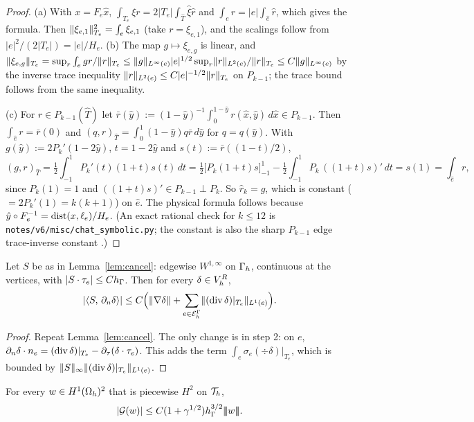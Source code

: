 \begin{proof}
(a) With $x=F_e\hat x$, $\int_{T_e}\xi r=2|T_e|\int_{\hat T}\hat\xi\hat r$ and $\int_er=|e|\int_{\hat e}\hat r$, which gives the formula. Then $\lVert \xi_{e,1}\rVert^2_{T_e}=\int_e\xi_{e,1}$ (take $r=\xi_{e,1}$), and the scalings follow from $|e|^2/(2|T_e|)=|e|/H_e$. (b) The map $g\mapsto\xi_{e,g}$ is linear, and $\lVert \xi_{e,g}\rVert_{T_e}=\sup_r\int_egr/\lVert r\rVert_{T_e}\le\lVert g\rVert_{L^\infty(e)}|e|^{1/2}\sup_r\lVert r\rVert_{L^2(e)}/\lVert r\rVert_{T_e}\le C\lVert g\rVert_{L^\infty(e)}$ by the inverse trace inequality $\lVert r\rVert_{L^2(e)}\le C|e|^{-1/2}\lVert r\rVert_{T_e}$ on $P_{k-1}$; the trace bound follows from the same inequality.

(c) For $r\in P_{k-1}(\hat T)$ let $\bar r(\hat y):=(1-\hat y)^{-1}\int_0^{1-\hat y}r(\hat x,\hat y)\,d\hat x\in P_{k-1}$. Then $\int_{\hat e}r=\bar r(0)$ and $(q,r)_{\hat T}=\int_0^1(1-\hat y)q\bar r\,d\hat y$ for $q=q(\hat y)$. With $g(\hat y):=2P_k'(1-2\hat y)$, $t=1-2\hat y$ and $s(t):=\bar r((1-t)/2)$,
\[
(g,r)_{\hat T}=\tfrac12\int_{-1}^1P_k'(t)(1+t)s(t)\,dt=\tfrac12\bigl[P_k(1+t)s\bigr]_{-1}^1-\tfrac12\int_{-1}^1P_k\,((1+t)s)'\,dt=s(1)=\int_{\hat e}r,
\]
since $P_k(1)=1$ and $((1+t)s)'\in P_{k-1}\perp P_k$. So $\hat r_k=g$, which is constant ($=2P_k'(1)=k(k+1)$) on $\hat e$. The physical formula follows because $\hat y\circ F_e^{-1}=\operatorname{dist}(x,\ell_e)/H_e$. (An exact rational check for $k\le12$ is \texttt{notes/v6/misc/chat\_symbolic.py}; the constant is also the sharp $P_{k-1}$ edge trace-inverse constant \cite{WarburtonHesthaven2003}.)
\end{proof}

\begin{lemma}\label{pd:lem:cancel}
Let $S$ be as in Lemma~\ref{lem:cancel}: edgewise $W^{1,\infty}$ on $\Gamma_h$, continuous at the vertices, with $|S\cdot\tau_e|\le Ch_\Gamma$. Then for every $\delta\in V_h^R$,
\[
|\langle S,\, \partial_n\delta\rangle|\le C\Bigl(\lVert \nabla\delta\rVert+\sum_{e\in\mathcal E_h^\Gamma}\lVert (\operatorname{div}\delta)|_{T_e}\rVert_{L^1(e)}\Bigr).
\]
\end{lemma}

\begin{proof}
Repeat Lemma~\ref{lem:cancel}. The only change is in step 2: on $e$, $\partial_n\delta\cdot n_e=(\operatorname{div}\delta)|_{T_e}-\partial_\tau(\delta\cdot\tau_e)$. This adds the term $\int_e\sigma_e(\div\delta)|_{T_e}$, which is bounded by $\lVert S\rVert_\infty\lVert (\operatorname{div}\delta)|_{T_e}\rVert_{L^1(e)}$.
\end{proof}

\begin{lemma}\label{pd:lem:G}
For every $w\in H^1(\Omega_h)^2$ that is piecewise $H^2$ on $\mathcal T_h$,
\[
|\mathcal G(w)|\le C(1+\gamma^{1/2})h_\Gamma^{3/2}|\!|\!|w|\!|\!| .
\]
\end{lemma}

